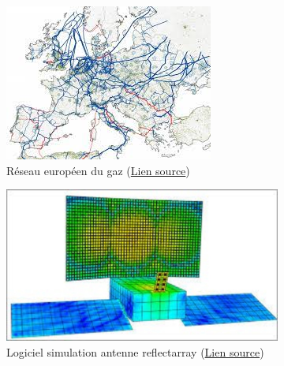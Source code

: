 \documentclass[french]{article}
\begin{document}
\begin{figure}[t]
	\begin{subfigure}[t]{0.3\textwidth}
		\includegraphics[width=\columnwidth]{EU_gas_network.jpeg}%
		\caption{Réseau européen du gaz (\href{https://vividmaps.com/the-european-natural-gas-network/}{Lien source})}
		\label{fig:network}
	\end{subfigure}\hfill
	\begin{subfigure}[t]{0.35\textwidth}
		\includegraphics[width=\columnwidth]{Reflectarray.jpg} 
		\caption{Logiciel simulation antenne reflectarray (\href{https://www.esa.int/Enabling_Support/Space_Engineering_Technology/Smart_design_of_flat_reflectarray_satellite_antennas}{Lien source})}
		\label{fig:array}
	\end{subfigure}\hfill
	\begin{subfigure}[t]{0.25\textwidth}

\end{subfigure}
\end{figure}
\end{document}
